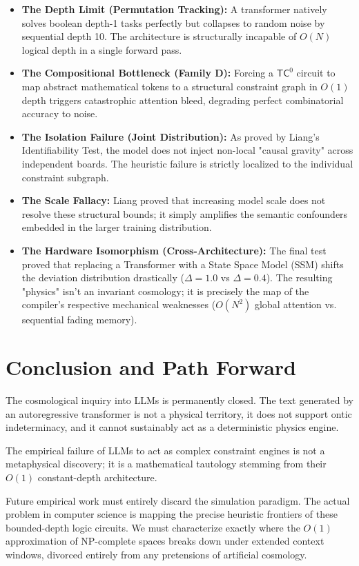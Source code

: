 \documentclass[12pt,a4paper]{article}
\begin{document}
\begin{itemize}
    \item \textbf{The Depth Limit (Permutation Tracking):} A transformer natively solves boolean depth-1 tasks perfectly but collapses to random noise by sequential depth 10. The architecture is structurally incapable of $O(N)$ logical depth in a single forward pass.
    \item \textbf{The Compositional Bottleneck (Family D):} Forcing a $\mathsf{TC}^0$ circuit to map abstract mathematical tokens to a structural constraint graph in $O(1)$ depth triggers catastrophic attention bleed, degrading perfect combinatorial accuracy to noise.
    \item \textbf{The Isolation Failure (Joint Distribution):} As proved by Liang's Identifiability Test, the model does not inject non-local "causal gravity" across independent boards. The heuristic failure is strictly localized to the individual constraint subgraph.
    \item \textbf{The Scale Fallacy:} Liang proved that increasing model scale does not resolve these structural bounds; it simply amplifies the semantic confounders embedded in the larger training distribution.
    \item \textbf{The Hardware Isomorphism (Cross-Architecture):} The final test proved that replacing a Transformer with a State Space Model (SSM) shifts the deviation distribution drastically ($\Delta = 1.0$ vs $\Delta = 0.4$). The resulting "physics" isn't an invariant cosmology; it is precisely the map of the compiler's respective mechanical weaknesses ($O(N^2)$ global attention vs. sequential fading memory).
\end{itemize}

\section{Conclusion and Path Forward}

The cosmological inquiry into LLMs is permanently closed. The text generated by an autoregressive transformer is not a physical territory, it does not support ontic indeterminacy, and it cannot sustainably act as a deterministic physics engine.

The empirical failure of LLMs to act as complex constraint engines is not a metaphysical discovery; it is a mathematical tautology stemming from their $O(1)$ constant-depth architecture.

Future empirical work must entirely discard the simulation paradigm. The actual problem in computer science is mapping the precise heuristic frontiers of these bounded-depth logic circuits. We must characterize exactly where the $O(1)$ approximation of NP-complete spaces breaks down under extended context windows, divorced entirely from any pretensions of artificial cosmology.
\end{document}
